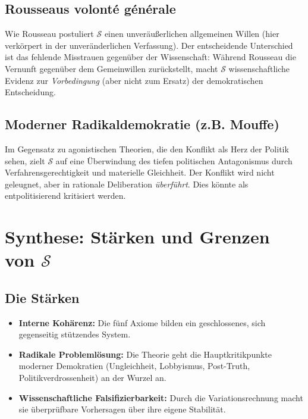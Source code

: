 \subsection{Rousseaus volonté générale}
Wie Rousseau postuliert $\mathcal{S}$ einen unveräußerlichen allgemeinen Willen (hier verkörpert in der unveränderlichen Verfassung). Der entscheidende Unterschied ist das fehlende Misstrauen gegenüber der Wissenschaft: Während Rousseau die Vernunft gegenüber dem Gemeinwillen zurückstellt, macht $\mathcal{S}$ wissenschaftliche Evidenz zur \emph{Vorbedingung} (aber nicht zum Ersatz) der demokratischen Entscheidung.

\subsection{Moderner Radikaldemokratie (z.B. Mouffe)}
Im Gegensatz zu agonistischen Theorien, die den Konflikt als Herz der Politik sehen, zielt $\mathcal{S}$ auf eine Überwindung des tiefen politischen Antagonismus durch Verfahrensgerechtigkeit und materielle Gleichheit. Der Konflikt wird nicht geleugnet, aber in rationale Deliberation \emph{überführt}. Dies könnte als entpolitisierend kritisiert werden.

\section{Synthese: Stärken und Grenzen von $\mathcal{S}$}

\subsection{Die Stärken}
\begin{itemize}
    \item \textbf{Interne Kohärenz:} Die fünf Axiome bilden ein geschlossenes, sich gegenseitig stützendes System.
    \item \textbf{Radikale Problemlösung:} Die Theorie geht die Hauptkritikpunkte moderner Demokratien (Ungleichheit, Lobbyismus, Post-Truth, Politikverdrossenheit) an der Wurzel an.
    \item \textbf{Wissenschaftliche Falsifizierbarkeit:} Durch die Variationsrechnung macht sie überprüfbare Vorhersagen über ihre eigene Stabilität.
\end{itemize}

